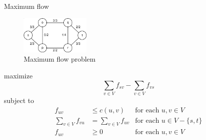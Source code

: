 \begin{frame}{Maximum flow}

    \begin{figure}
        \includegraphics[width=0.3\textwidth]{assets/maximum_flow.png}
        \caption{Maximum flow problem}
    \end{figure}

    maximize $$\sum_{v\in V}f_{sv}-\sum_{v\in V}f_{vs}$$
    subject to 
    \begin{align*}
        f_{uv} &\le c(u,v) &\text{for each }u,v\in V\\
        \sum_{v\in V} f_{vu}&= \sum_{v\in V} f_{uv} &\text{for each } u\in V-\{s,t\}\\
        f_{uv}&\ge 0 &\text{for each }u,v\in V
    \end{align*}

\end{frame}
